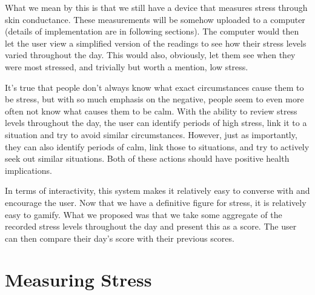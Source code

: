 \documentclass{scrartcl}
\begin{document}
What we mean by this is that we still have a device that measures stress through skin conductance.
These measurements will be somehow uploaded
to a computer (details of implementation are in following sections). The computer would then let the user view a simplified version
of the readings to see how their stress levels varied throughout the day. This would also, obviously, let them see when
they were most stressed, and trivially but worth a mention, low stress.

It's true that people don't always know what exact circumstances cause them to be stress, but with so much emphasis on the
negative, people seem to even more often not know what causes them to be calm. With the ability to review stress levels throughout
the day, the user can identify periods of high stress, link it to a situation and try to avoid similar circumstances. However,
just as importantly, they can also identify periods of calm, link those to situations, and try to actively seek out
similar situations. Both of these actions should have positive health implications.

In terms of interactivity, this system makes it relatively easy to converse with and encourage the user. Now that we have
a definitive figure for stress, it is relatively easy to gamify. What we proposed was that we take some aggregate of the
recorded stress levels throughout the day and present this as a score. The user can then compare their day's score with their
previous scores.


\section{Measuring Stress}
\end{document}
